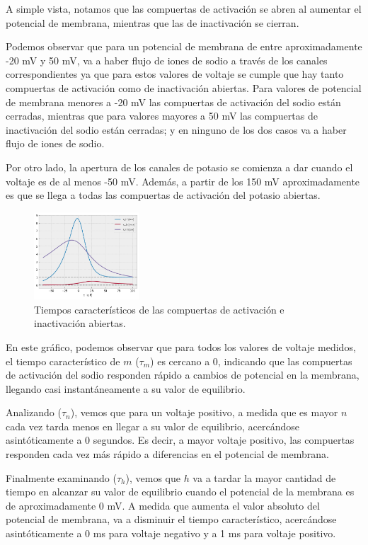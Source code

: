 \documentclass[aps,twocolumn,groupedaddress]{revtex4-2}
\begin{document}
A simple vista, notamos que las compuertas de activación se abren al aumentar el potencial de membrana, mientras que las de inactivación se cierran.

Podemos observar que para un potencial de membrana de entre aproximadamente -20 mV y 50 mV, va a haber flujo de iones de sodio a través de los canales correspondientes ya que para estos valores de voltaje se cumple que hay tanto compuertas de activación como de inactivación abiertas. Para valores de potencial de membrana menores a -20 mV las compuertas de activación del sodio están cerradas, mientras que para valores mayores a 50 mV las compuertas de inactivación del sodio están cerradas; y en ninguno de los dos casos va a haber flujo de iones de sodio.

Por otro lado, la apertura de los canales de potasio se comienza a dar cuando el voltaje es de al menos -50 mV. Además, a partir de los 150 mV aproximadamente es que se llega a todas las compuertas de activación del potasio abiertas. 

\begin{figure}[ht]
    \centering
    \includegraphics[width=0.35\textwidth]{figs/ej2_tiempos-caracteristicos.png}
    \caption{Tiempos característicos de las compuertas de activación e inactivación abiertas.} 
    \label{fig:ej2_tiempos-caracteristicos}
\end{figure}

En este gráfico, podemos observar que para todos los valores de voltaje medidos, el tiempo característico de $m$ (\(\tau_m\)) es cercano a 0, indicando que las compuertas de activación del sodio responden rápido a cambios de potencial en la membrana, llegando casi instantáneamente a su valor de equilibrio. 

Analizando (\(\tau_n\)), vemos que para un voltaje positivo, a medida que es mayor $n$ cada vez tarda menos en llegar a su valor de equilibrio, acercándose asintóticamente a 0 segundos. Es decir, a mayor voltaje positivo, las compuertas responden cada vez más rápido a diferencias en el potencial de membrana.

Finalmente examinando (\(\tau_h\)), vemos que $h$ va a tardar la mayor cantidad de tiempo en alcanzar su valor de equilibrio cuando el potencial de la membrana es de aproximadamente 0 mV. A medida que aumenta el valor absoluto del potencial de membrana, va a disminuir el tiempo característico, acercándose asintóticamente a 0 ms para voltaje negativo y a 1 ms para voltaje positivo. 
\end{document}

